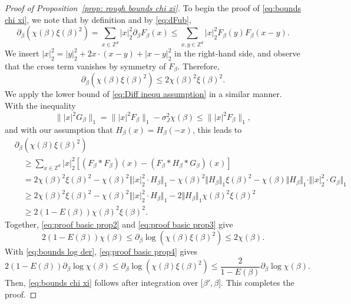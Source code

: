 \documentclass[11pt,a4paper]{article}
\numberwithin{equation}{section}
\theoremstyle{plain}
\theoremstyle{definition}
\newcommand\1{\mathds{1}}
\begin{document}
\begin{proof}[Proof of Proposition~\textup{\ref{prop: rough bounds chi xi}}]
To begin the proof of \eqref{eq:bounds chi xi}, we note that
by definition and by \eqref{eq:dFub},
\begin{equation}
	\partial_\beta(\chi(\beta)\xi(\beta)^2)
    =\sum_{x\in \mathbb Z^d}|x|_2^2 \partial_\beta F_\beta(x)
    \le
    \sum_{x,y\in \mathbb Z^d}|x|_2^2 F_\beta(y)F_\beta(x-y).
\end{equation}
We insert $|x|_2^2 = |y|_2^2 + 2x\cdot(x-y) + |x-y|_2^2$ in the right-hand side,
and observe that the cross term vanishes by symmetry of $F_\beta$.
Therefore,
\begin{equation}\label{eq:proof basic prop2}
	\partial_\beta(\chi(\beta)\xi(\beta)^2)\leq 2\chi(\beta)^2\xi(\beta)^2.
\end{equation}
We apply the lower bound of
\eqref{eq:Diff inequ assumption} in a similar manner.
With the inequality
\begin{equation}\label{eq:ineq l2 G F}
    \| |x|^2 G_\beta \|_1 = \| |x|^2 F_\beta \|_1 - \sigma_J^2\chi(\beta)
    \le \| |x|^2 F_\beta \|_1,
\end{equation}
and with our assumption that $H_\beta(x)=H_\beta(-x)$, this leads to
\begin{align}
	&\partial_\beta(\chi(\beta)\xi(\beta)^2) \nonumber
    \\&\quad \geq \sum_{x\in \mathbb Z^d}|x|_2^2
    \left[(F_\beta * F_\beta)(x) - (F_\beta * H_\beta *G_\beta)(x)\right]
        \nonumber
    \\&\quad =2\chi(\beta)^2\xi(\beta)^2-\chi(\beta)^2\Vert |x|_2^2\cdot H_\beta\Vert_1-\chi(\beta)^2\Vert H_\beta\Vert_1 \xi(\beta)^2-\chi(\beta)\Vert H_\beta\Vert_1\cdot\Vert |x|_2^2\cdot G_\beta\Vert_1
    \nonumber
    \\
    &\quad \ge 2\chi(\beta)^2\xi(\beta)^2-\chi(\beta)^2\Vert |x|_2^2 \cdot H_\beta\Vert_1
    - 2 \Vert H_\beta\Vert_1 \chi(\beta)^2\xi(\beta)^2
    \nonumber
    \\ &\quad
    \ge
    2(1-E(\beta))\chi(\beta)^2\xi(\beta)^2.
\label{eq:proof basic prop3}
\end{align}
Together, \eqref{eq:proof basic prop2} and \eqref{eq:proof basic prop3} give
\begin{equation}\label{eq:proof basic prop4}
	2(1-E(\beta))\chi(\beta)\leq \partial_\beta \log(\chi(\beta)\xi(\beta)^2)\leq 2\chi(\beta).
\end{equation}
With \eqref{eq:bounds log der}, \eqref{eq:proof basic prop4} gives
\begin{equation}
	2(1-E(\beta))\partial_\beta\log \chi(\beta)\leq \partial_\beta\log(\chi(\beta)\xi(\beta)^2)\leq \frac{2}{1-E(\beta)}\partial_\beta \log \chi(\beta).
\end{equation}
Then, \eqref{eq:bounds chi xi} follows after integration over $[\beta',\beta$].
This completes the proof.
\end{proof}
\end{document}
